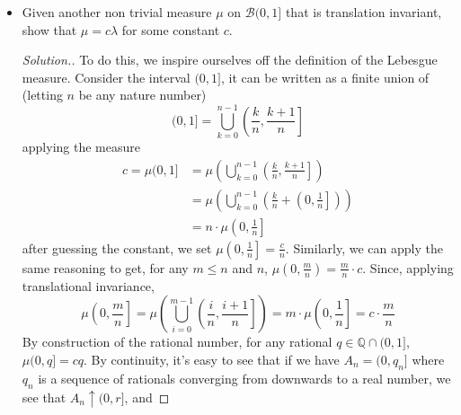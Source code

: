 \documentclass[12pt]{article}
\begin{document}
\begin{enumerate}
\begin{itemize}
\begin{proof}[solution]
						\begin{align*}
							\mu\left(\bigcup_{i\geq 1} B_i\right)&= \lambda\left(\bigcup_{i \geq 1}(B_i) + a \right) \\
							&=\lambda\left(\bigcup_{i \geq 1}B_i + a \right)\\
							&= \sum_{i \geq 1} \lambda(B_i + a)\\
							&= \sum_{i \geq 1} \mu(B_i)
						\end{align*}
						Thus $\mu$ is countably additive and forms a measure on $\mathcal{B}(\mathbb{R})$. To finish off the proof, consider the set of open intervals, which form a $\pi$-system on the reals. It's clear that $\mu = \lambda$ on the latter $\pi$-system, thus they agree on the $\sigma$-algebra generated by that $\pi$-system, therefore $\mu = \lambda$ on $\mathcal{B}(\mathbb{R})$ 
					\end{proof}
					\item Given another non trivial measure $\mu$ on $\mathcal{B}(0,1]$ that is translation invariant, show that $\mu = c \lambda$ for some constant $c$. 
					\begin{proof}[Solution.]
						To do this, we inspire ourselves off the definition of the Lebesgue measure. Consider the interval $(0,1]$, it can be written as a finite union of (letting $n$ be any nature number)
						$$ (0,1] = \bigcup_{k=0}^{n-1} \left( \frac{k}{n}, \frac{k+1}{n}\right]$$
						applying the measure 
						\begin{align*}
							c=\mu(0,1] &= \mu\left(\bigcup_{k=0}^{n-1} \left( \frac{k}{n}, \frac{k+1}{n}\right] \right) \\
							&= \mu\left(\bigcup_{k=0}^{n-1} \left( \frac{k}{n} + \left(0, \frac{1}{n}\right]\right) \right)\\
							&= n \cdot \mu\left(0,\frac{1}{n}\right]
						\end{align*}
						after guessing the constant, we set $\mu\left(0,\frac{1}{n}\right] = \frac{c}{n}$. Similarly, we can apply the same reasoning to get, for any $m \leq n$ and $n$, $\mu\left(0,\frac{m}{n}\right) = \frac{m}{n} \cdot c$. Since, applying translational invariance, 
						\begin{equation*}
							\mu \left(0, \frac{m}{n} \right] = \mu \left(\bigcup_{i=0}^{m-1} \left(\frac{i}{n},\frac{i+1}{n}\right]\right) = m\cdot \mu\left(0,\frac{1}{n}\right] = c \cdot \frac{m}{n}
						\end{equation*}
						By construction of the rational number, for any rational $q \in \mathbb{Q} \cap (0,1]$, $\mu(0,q] = cq$. By continuity, it's easy to see that if we have $A_n = (0,q_n]$ where $q_n$ is a sequence of rationals converging from downwards to a real number, we see that $A_n \uparrow (0,r]$, and 

\end{proof}
\end{itemize}
\end{enumerate}
\end{document}
